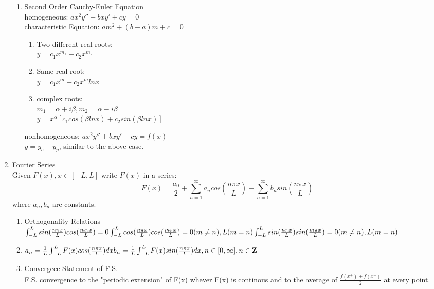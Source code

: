 \documentclass[10pt]{article}
\newcommand{\Z}{\mathbf{Z}}
\begin{document}
\begin{multicols}{2}
\begin{enumerate}
\begin{enumerate}
		\item Second Order Cauchy-Euler Equation\\
		homogeneous: $ax^2y'' + bxy' + cy = 0$\\
		characteristic Equation: $am^2 + (b-a)m + c = 0$
		\begin{enumerate}
			\item Two different real roots:\\
			$y = c_1x^{m_1} + c_2x^{m_2}$
			\item Same real root:\\
			$y = c_1x^m + c_2x^mlnx$
			\item complex roots:\\
			$m_1 = \alpha + i \beta, m_2 = \alpha - i \beta$\\
			$y = x^{\alpha}[c_1cos(\beta lnx) + c_2sin(\beta lnx)]$
		\end{enumerate}
		nonhomogeneous: $ax^2y'' + bxy' + cy = f(x)$\\
		$y = y_c + y_p$, similar to the above case.  
	\end{enumerate}

	\item Fourier Series\\
	Given $F(x), x\in [-L,L]$ write $F(x)$ in a series:
	$$F(x) = \frac{a_0}{2} + \sum_{n = 1}^{\infty}a_n cos(\frac{n\pi x}{L}) + \sum_{n = 1}^{\infty}b_n sin(\frac{n\pi x}{L})$$ where $a_n, b_n$ are constants.
	\begin{enumerate}
		\item  Orthogonality Relations\\
		$\int_{-L}^{L}sin(\frac{n\pi x}{L})cos(\frac{m\pi x}{L}) = 0\\
		\int_{-L}^{L}cos(\frac{n\pi x}{L})cos(\frac{m\pi x}{L}) = 0(m \neq n), L(m = n)\\
		\int_{-L}^{L}sin(\frac{n\pi x}{L})sin(\frac{m\pi x}{L}) = 0(m \neq n), L(m = n)$
		
		\item $a_n = \frac{1}{L}\int_{-L}^{L}F(x)cos(\frac{n\pi x}{L})dx\\
		b_n = \frac{1}{L}\int_{-L}^{L}F(x)sin(\frac{n\pi x}{L})dx, n \in [0, \infty], n \in \Z$
		
		\item Convergece Statement of F.S.\\
		F.S. convergence to the "periodic extension" of F(x) whever F(x) is continous and to the average of $\frac{f(x^+)+f(x^-)}{2}$ at every point.
		

\end{enumerate}
\end{enumerate}
\end{multicols}
\end{document}
